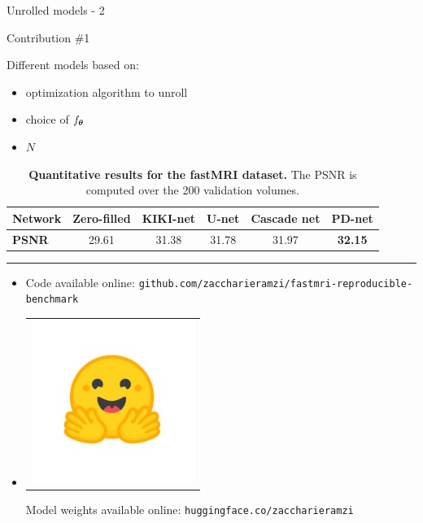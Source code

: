 \begin{frame}{Unrolled models - 2}
    \begin{exampleblock}{Contribution \#1}
    \end{exampleblock}
    Different models based on:
    \begin{itemize}
        \item optimization algorithm to unroll
        \item choice of $f_{{\boldsymbol{\theta}}}$
        \item $N$
    \end{itemize}
    \pause

    \begin{overprint}
        
    
        \vspace{-1em}
        \begin{table}[h]
            \centering
            \caption{\textbf{Quantitative results for the fastMRI dataset.} The PSNR is computed over the 200 validation volumes.}
            \label{tab:quanti-fastmri}
            \vspace{-0.5em}
            \begin{tabular}{l|c|c|c|c|c}
            \textbf{Network} & \textbf{Zero-filled} & \textbf{KIKI-net} & \textbf{U-net} & \textbf{Cascade net} & \textbf{PD-net}\footnotemark \\ \hline
            \textbf{PSNR} & 29.61 & 31.38 & 31.78 & 31.97 & \textbf{32.15}
            \end{tabular}%
            \end{table}

    
    \noindent\rule{\textwidth}{1pt}

        \begin{itemize}
            \item {} Code available online: \texttt{github.com/zaccharieramzi/fastmri-reproducible-benchmark}
            \item\begin{tabular}{@{}c@{}}\includegraphics[width=3ex]{Figures/hf_logo.jpeg}\end{tabular}Model weights available online: \texttt{huggingface.co/zaccharieramzi}
        \end{itemize}
    
\end{overprint}
    


\end{frame}

